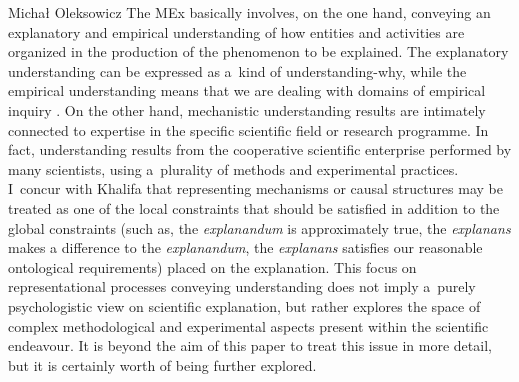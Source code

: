 \begin{artengenv}{Michał Oleksowicz}
The MEx basically involves, on the one hand, conveying an explanatory and empirical understanding of how entities and activities are organized in the production of the phenomenon to be explained. The explanatory understanding can be expressed as a~kind of understanding-why, while the empirical understanding means that we are dealing with domains of empirical inquiry
\parencite[][pp.1–3]{khalifa_understanding_2017}. %
 On the other hand, mechanistic understanding results are intimately connected to expertise in the specific scientific field or research programme. In fact, understanding results from the cooperative scientific enterprise performed by many scientists, using a~plurality of methods and experimental practices. I~concur with Khalifa that representing mechanisms or causal structures may be treated as one of the local constraints that should be satisfied in addition to the global constraints (such as, the \textit{explanandum} is approximately true, the \textit{explanans} makes a difference to the \textit{explanandum}, the \textit{explanans} satisfies our reasonable ontological requirements) placed on the explanation. This focus on representational processes conveying understanding does not imply a~purely psychologistic view on scientific explanation, but rather explores the space of complex methodological and experimental aspects present within the scientific endeavour. It is beyond the aim of this paper to treat this issue in more detail, but it is certainly worth of being further explored.


\end{artengenv}
